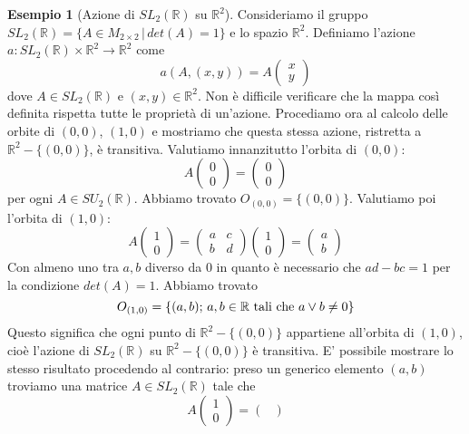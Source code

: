\documentclass[12pt,a4paper]{report}
\theoremstyle{definition}
\theoremstyle{Theorem}
\theoremstyle{definition}
\newtheorem{Ex}[Def]{Esempio}
\theoremstyle{definition}
\theoremstyle{definition}
\begin{document}
\begin{Ex} [Azione di $SL_2(\mathbb{R})$ su $\mathbb{R}^2$]
	Consideriamo il gruppo $SL_2(\mathbb{R})=\{A\in M_{2\times 2}\,|\,det(A)=1\}$ e lo spazio $\mathbb{R}^2$. Definiamo l'azione $a:SL_2(\mathbb{R})\times \mathbb{R}^2\rightarrow\mathbb{R}^2$ come 
	$$a(A,(x,y))=A\begin{pmatrix}
		x\\y
	\end{pmatrix}$$
dove $A\in SL_2(\mathbb{R})$ e $(x,y)\in\mathbb{R}^2$. Non è difficile verificare che la mappa così definita rispetta tutte le proprietà di un'azione. Procediamo ora al calcolo delle orbite di $(0,0)$, $(1,0)$ e mostriamo che questa stessa azione, ristretta a $\mathbb{R}^2-\{(0,0)\}$, è transitiva.
Valutiamo innanzitutto l'orbita di $(0,0)$:
$$A\begin{pmatrix}
	0\\0
\end{pmatrix}=\begin{pmatrix}
0\\0
\end{pmatrix}$$
per ogni $A\in SU_2(\mathbb{R})$. Abbiamo trovato $O_{(0,0)}=\{(0,0)\}$. Valutiamo poi l'orbita di $(1,0)$:
$$A\begin{pmatrix}
	1\\0
\end{pmatrix}=\begin{pmatrix}
a&c\\
b&d
\end{pmatrix}\begin{pmatrix}
1\\0
\end{pmatrix}=\begin{pmatrix}
a\\b
\end{pmatrix}$$
Con almeno uno tra $a,b$ diverso da $0$ in quanto è necessario che $ad-bc=1$ per la condizione $det(A)=1$. Abbiamo trovato $$O_{(1,0)}=\{(a,b);\, a,b\in\mathbb{R}\,\, \hbox{tali che} \, \, a \vee b\neq 0 \}$$ 
Questo significa che ogni punto di $\mathbb{R}^2-\{(0,0)\}$ appartiene all'orbita di $(1,0)$, cioè l'azione di $SL_2(\mathbb{R})$ su $\mathbb{R}^2-\{(0,0)\}$ è transitiva. E' possibile mostrare lo stesso risultato procedendo al contrario: preso un generico elemento $(a,b)$ troviamo una matrice $A\in SL_2(\mathbb{R})$ tale che 
$$A\begin{pmatrix}
	1\\0
\end{pmatrix}=\begin{pmatrix}

\end{pmatrix}$$
\end{Ex}
\end{document}
